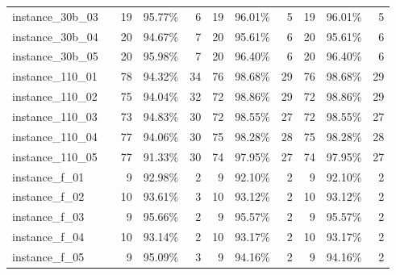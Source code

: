 \documentclass[12pt,a4paper,openright,twoside]{book}
\begin{document}
\begin{table}[H]
{\begin{tabular}{|ll|rrr|rrr|rrr|}
 instance\_30b\_03             &     &   19  &    95.77\%  &   6      &   19  &   96.01\%  &   5      &   19  &    96.01\%  &   5  \\      
 instance\_30b\_04             &     &   20  &    94.67\%  &   7      &   20  &   95.61\%  &   6      &   20  &    95.61\%  &   6  \\      
 instance\_30b\_05             &     &   20  &    95.98\%  &   7      &   20  &   96.40\%  &   6      &   20  &    96.40\%  &   6  \\      
 instance\_110\_01            &     &   78  &    94.32\%  &   34     &   76  &   98.68\%  &   29     &   76  &    98.68\%  &   29  \\        
 instance\_110\_02            &     &   75  &    94.04\%  &   32     &   72  &   98.86\%  &   29     &   72  &    98.86\%  &   29  \\        
 instance\_110\_03            &     &   73  &    94.83\%  &   30     &   72  &   98.55\%  &   27     &   72  &    98.55\%  &   27  \\        
 instance\_110\_04            &     &   77  &    94.06\%  &   30     &   75  &   98.28\%  &   28     &   75  &    98.28\%  &   28  \\        
 instance\_110\_05            &     &   77  &    91.33\%  &   30     &   74  &   97.95\%  &   27     &   74  &    97.95\%  &   27  \\        
 instance\_f\_01              &     &   9  &     92.98\%  &   2      &   9  &    92.10\%  &   2     &   9  &      92.10\%  &   2  \\       
 instance\_f\_02              &     &   10  &    93.61\%  &   3      &   10  &   93.12\%  &   2      &   10  &    93.12\%  &   2  \\      
 instance\_f\_03              &     &   9  &     95.66\%  &   2      &   9  &    95.57\%  &   2       &   9  &    95.57\%  &   2  \\     
 instance\_f\_04              &     &   10  &    93.14\%  &   2      &   10  &   93.17\%  &   2      &   10  &    93.17\%  &   2  \\      
 instance\_f\_05              &     &   9  &     95.09\%  &   3      &   9  &    94.16\%  &   2       &   9  &    94.16\%  &   2  \\     
  \hline
\end{tabular}
}
\end{table}
\end{document}
